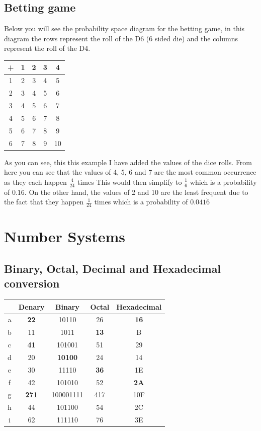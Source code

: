 \documentclass{article}
\begin{document}
\subsection{Betting game}
Below you will see the probability space diagram for the betting game, in this diagram the rows represent the roll of the D6 (6 sided die) and the columns represent the roll of the D4. 
\begin{center}
\begin{tabular}{ |c||c|c|c|c| } 
 \hline
 + & 1 & 2 & 3 & 4 \\
 \hline
 \hline
 1 & 2 & 3 & 4 & 5 \\ 
 \hline
 2 & 3 & 4 & 5 & 6 \\ 
 \hline
 3 & 4 & 5 & 6 & 7 \\ 
 \hline
 4 & 5 & 6 & 7 & 8 \\ 
 \hline
 5 & 6 & 7 & 8 & 9 \\ 
 \hline
 6 & 7 & 8 & 9 & 10 \\
 \hline
\end{tabular}
\end{center}
As you can see, this this example I have added the values of the dice rolls. From here you can see that the values of 4, 5, 6 and 7 are the most common occurrence as they each happen $\frac{4}{24}$ times This would then simplify to $\frac{1}{6}$ which is a probability of $0.1\dot{6}$. On the other hand, the values of 2 and 10 are the least frequent due to the fact that they happen $\frac{1}{24}$ times which is a probability of $0.041\dot{6}$

\section{Number Systems}
\subsection{Binary, Octal, Decimal and Hexadecimal conversion}
\begin{center}
\begin{tabular}{ ||c|c c c c|| } 
 \hline
   & Denary & Binary & Octal & Hexadecimal \\
 \hline
 \hline
 a & \textbf{22} & 10110 & 26 & \textbf{16} \\ 
 \hline
 b & 11 & 1011 & \textbf{13} & B \\ 
 \hline
 c & \textbf{41} & 101001 & 51 & 29 \\ 
 \hline
 d & 20 & \textbf{10100} & 24 & 14 \\ 
 \hline
 e & 30 & 11110 & \textbf{36} & 1E \\ 
 \hline
 f & 42 & 101010 & 52 & \textbf{2A} \\
 \hline
 g & \textbf{271} & 100001111 & 417 & 10F\\ 
 \hline
 h & 44 & 101100 & 54 & 2C \\ 
 \hline
 i & 62 & 111110 & 76 & 3E \\ 
 \hline
\end{tabular}
\end{center}
\end{document}
